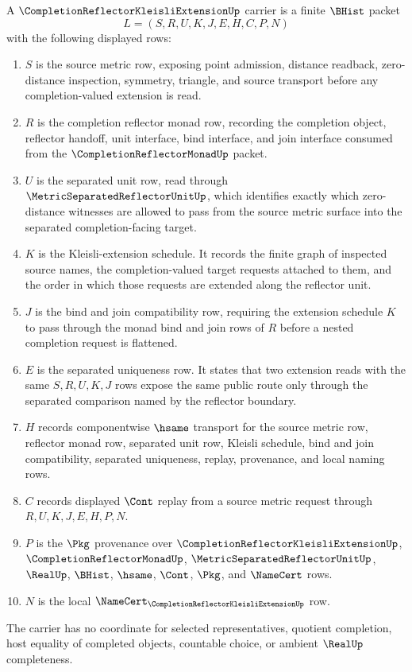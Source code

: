 \begin{definition}
\label{def:completion-reflector-kleisli-extension-carrier}
A $\CompletionReflectorKleisliExtensionUp$ carrier is a finite $\BHist$ packet
$$
L=(S,R,U,K,J,E,H,C,P,N)
$$
with the following displayed rows:
\begin{enumerate}
\item $S$ is the source metric row, exposing point admission, distance readback, zero-distance inspection, symmetry, triangle, and source transport before any completion-valued extension is read.
\item $R$ is the completion reflector monad row, recording the completion object, reflector handoff, unit interface, bind interface, and join interface consumed from the $\CompletionReflectorMonadUp$ packet.
\item $U$ is the separated unit row, read through $\MetricSeparatedReflectorUnitUp$, which identifies exactly which zero-distance witnesses are allowed to pass from the source metric surface into the separated completion-facing target.
\item $K$ is the Kleisli-extension schedule. It records the finite graph of inspected source names, the completion-valued target requests attached to them, and the order in which those requests are extended along the reflector unit.
\item $J$ is the bind and join compatibility row, requiring the extension schedule $K$ to pass through the monad bind and join rows of $R$ before a nested completion request is flattened.
\item $E$ is the separated uniqueness row. It states that two extension reads with the same $S,R,U,K,J$ rows expose the same public route only through the separated comparison named by the reflector boundary.
\item $H$ records componentwise $\hsame$ transport for the source metric row, reflector monad row, separated unit row, Kleisli schedule, bind and join compatibility, separated uniqueness, replay, provenance, and local naming rows.
\item $C$ records displayed $\Cont$ replay from a source metric request through $R,U,K,J,E,H,P,N$.
\item $P$ is the $\Pkg$ provenance over $\CompletionReflectorKleisliExtensionUp$, $\CompletionReflectorMonadUp$, $\MetricSeparatedReflectorUnitUp$, $\RealUp$, $\BHist$, $\hsame$, $\Cont$, $\Pkg$, and $\NameCert$ rows.
\item $N$ is the local $\NameCert_{\CompletionReflectorKleisliExtensionUp}$ row.
\end{enumerate}
The carrier has no coordinate for selected representatives, quotient completion, host equality of completed objects, countable choice, or ambient $\RealUp$ completeness.
\end{definition}

